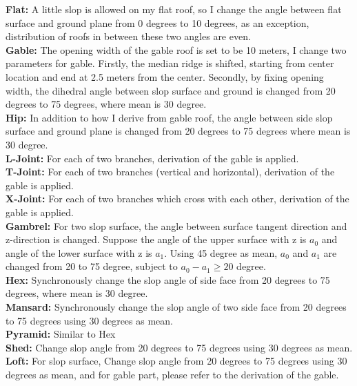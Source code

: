 \documentclass{iitthesis}
\begin{document}
{\noindent \textbf{Flat:}} A little slop is allowed on my flat roof, so I change the angle between flat surface and ground plane from 0 degrees to 10 degrees, as an exception, distribution of roofs in between these two angles are even.
\\ \textbf{Gable:} The opening width of the gable roof is set to be 10 meters, I change two parameters for gable. Firstly, the median ridge is shifted, starting from center location and end at 2.5 meters from the center. Secondly, by fixing opening width, the dihedral angle between slop surface and ground is changed from 20 degrees to 75 degrees, where mean is 30 degree.
\\ \textbf{Hip:} In addition to how I derive from gable roof, the angle between side slop surface and ground plane is changed from 20 degrees to 75 degrees where mean is 30 degree.
\\ \textbf{L-Joint:} For each of two branches, derivation of the gable is applied.
\\ \textbf{T-Joint:} For each of two branches (vertical and horizontal), derivation of the gable is applied.
\\ \textbf{X-Joint:} For each of two branches which cross with each other, derivation of the gable is applied.
\\ \textbf{Gambrel:} For two slop surface, the angle between surface tangent direction and z-direction is changed. Suppose the angle of the upper surface with z is $a_0$ and angle of the lower surface with z is $a_1$. Using 45 degree as mean, $a_0$ and $a_1$ are changed from 20 to 75 degree, subject to $a_0-a_1\geq 20$ degree.
\\ \textbf{Hex:} Synchronously change the slop angle of side face from 20 degrees to 75 degrees, where mean is 30 degree.
\\ \textbf{Mansard:} Synchronously change the slop angle of two side face from 20 degrees to 75 degrees using 30 degrees as mean.
\\ \textbf{Pyramid:} Similar to Hex
\\ \textbf{Shed:} Change slop angle from 20 degrees to 75 degrees using 30 degrees as mean.
\\ \textbf{Loft:} For slop surface, Change slop angle from 20 degrees to 75 degrees using 30 degrees as mean, and for gable part, please refer to the derivation of the gable.
\end{document}
